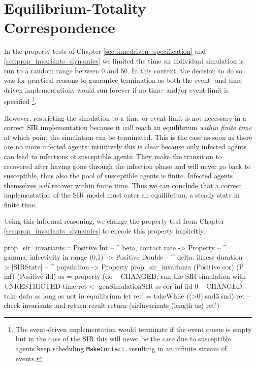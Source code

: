 \chapter{Equilibrium-Totality Correspondence}
\label{app:equilibrium_totality}
In the property tests of Chapter \ref{sec:timedriven_specification} and \ref{sec:prop_invariants_dynamics} we limited the time an individual simulation is run to a random range between 0 and 50. In this context, the decision to do so was for practical reasons to guarantee termination as both the event- and time-driven implementations would run forever if no time- and/or event-limit is specified \footnote{The event-driven implementation would terminate if the event queue is empty but in the case of the SIR this will never be the case due to susceptible agents keep scheduling \texttt{MakeContact}, resulting in an infinite stream of events.}.

However, restricting the simulation to a time  or event limit is not necessary in a correct SIR implementation because it  \textit{will} reach an equilibrium \textit{within finite time} at which point the simulation can be terminated. This is the case as soon as there are no more infected agents: intuitively this is clear because only infected agents can lead to infections of susceptible agents. They make the transition to recovered after having gone through the infection phase and will never go back to susceptible, thus also the pool of susceptible agents is finite. Infected agents themselves \textit{will} recover within finite time. Thus we can conclude that a correct implementation of the SIR model must enter an equilibrium, a steady state in finite time.

Using this informal reasoning, we change the property test from Chapter \ref{sec:prop_invariants_dynamics} to encode this property implicitly.

\begin{HaskellCode}
prop_sir_invariants :: Positive Int    -- ^ beta, contact rate
                    -> Property        -- ^ gamma, infectivity in range (0,1)
                    -> Positive Double -- ^ delta, illness duration
                    -> [SIRState]      -- ^ population
                    -> Property
prop_sir_invariants 
    (Positive cor) (P inf) (Positive ild) as  = property (do
  -- CHANGED: run the SIR simulation with UNRESTRICTED time
  ret <- genSimulationSIR ss cor inf ild 0
  -- CHANGED: take data as long as not in equilibrium
  let ret' = takeWhile ((>0).snd3.snd) ret
  -- check invariants and return result
  return (sirInvariants (length as) ret')
\end{HaskellCode}

